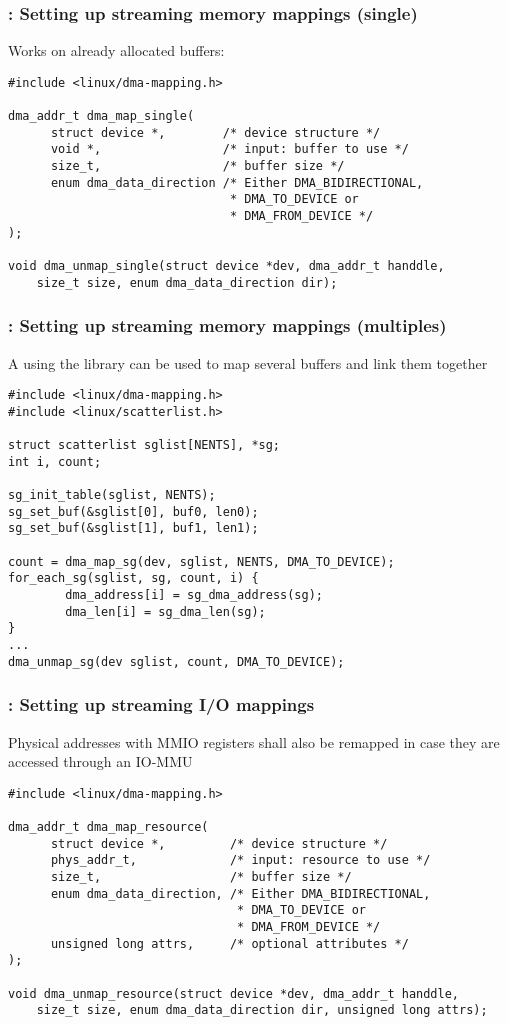 \begin{frame}[fragile]
  \frametitle{: Setting up streaming memory mappings (single)}
  Works on already allocated buffers:
  \vfill
\begin{verbatim}
#include <linux/dma-mapping.h>

dma_addr_t dma_map_single(
      struct device *,        /* device structure */
      void *,                 /* input: buffer to use */
      size_t,                 /* buffer size */
      enum dma_data_direction /* Either DMA_BIDIRECTIONAL,
                               * DMA_TO_DEVICE or
                               * DMA_FROM_DEVICE */
);

void dma_unmap_single(struct device *dev, dma_addr_t handdle,
    size_t size, enum dma_data_direction dir);
\end{verbatim}
\end{frame}

\begin{frame}[fragile]
  \frametitle{: Setting up streaming memory mappings (multiples)}
  A  using the  library can be
  used to map several buffers and link them together
  \vfill
\begin{verbatim}
#include <linux/dma-mapping.h>
#include <linux/scatterlist.h>

struct scatterlist sglist[NENTS], *sg;
int i, count;

sg_init_table(sglist, NENTS);
sg_set_buf(&sglist[0], buf0, len0);
sg_set_buf(&sglist[1], buf1, len1);

count = dma_map_sg(dev, sglist, NENTS, DMA_TO_DEVICE);
for_each_sg(sglist, sg, count, i) {
        dma_address[i] = sg_dma_address(sg);
        dma_len[i] = sg_dma_len(sg);
}
...
dma_unmap_sg(dev sglist, count, DMA_TO_DEVICE);
\end{verbatim}
\end{frame}

\begin{frame}[fragile]
  \frametitle{: Setting up streaming I/O mappings}
  Physical addresses with MMIO registers shall also be remapped in case
  they are accessed through an IO-MMU
\begin{verbatim}
#include <linux/dma-mapping.h>

dma_addr_t dma_map_resource(
      struct device *,         /* device structure */
      phys_addr_t,             /* input: resource to use */
      size_t,                  /* buffer size */
      enum dma_data_direction, /* Either DMA_BIDIRECTIONAL,
                                * DMA_TO_DEVICE or
                                * DMA_FROM_DEVICE */
      unsigned long attrs,     /* optional attributes */
);

void dma_unmap_resource(struct device *dev, dma_addr_t handdle,
    size_t size, enum dma_data_direction dir, unsigned long attrs);
\end{verbatim}
\end{frame}


